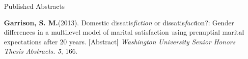 \documentclass {resume}
\newcommand{\meb}{{\bf Garrison, S. M.}\xspace}
\newlength{\wideitemsep}
\let\olditem\item
\renewcommand{\item}{\setlength{\itemsep}{\wideitemsep}\olditem}
\begin{document}
\begin{samepage}\begin{rSection}{\textrm{Published Abstracts}}
\begin{etaremune}\item\meb (2013). Domestic dissatis{\em fiction} or dissatis{\em fact}ion?: Gender differences in a multilevel model of marital satisfaction using prenuptial marital expectations after 20 years. [Abstract] {\em Washington University Senior Honors Thesis Abstracts. 5}, 166.\end{etaremune}\end{rSection}\end{samepage}%

\end{document}
